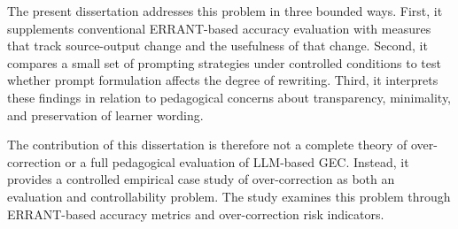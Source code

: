 The present dissertation addresses this problem in three bounded ways. First, it supplements conventional ERRANT-based accuracy evaluation with measures that track source-output change and the usefulness of that change. Second, it compares a small set of prompting strategies under controlled conditions to test whether prompt formulation affects the degree of rewriting. Third, it interprets these findings in relation to pedagogical concerns about transparency, minimality, and preservation of learner wording.

The contribution of this dissertation is therefore not a complete theory of over-correction or a full pedagogical evaluation of LLM-based GEC. Instead, it provides a controlled empirical case study of over-correction as both an evaluation and controllability problem. The study examines this problem through ERRANT-based accuracy metrics and over-correction risk indicators.
